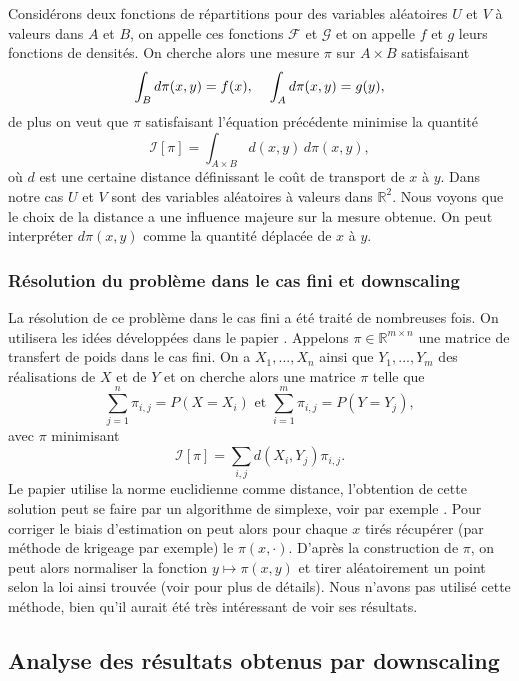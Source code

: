 \documentclass[a4paper,11pt]{article}
\numberwithin{equation}{section}
\begin{document}
Considérons deux fonctions de répartitions pour des variables aléatoires $U$ et $V$ à valeurs dans $A$ et $B$, on appelle ces fonctions $\mathcal{F}$ et $\mathcal{G}$ et on appelle $f$ et $g$ leurs fonctions de densités. On cherche alors une mesure $\pi$ sur  $A \times B$ satisfaisant
\[\int_{B} d\pi(x,y)= f(x), \hspace{4mm} \int_{A}  d \pi(x,y)= g(y),\]
de plus on veut que $\pi$ satisfaisant l'équation précédente minimise la quantité
\[\mathcal{I}[\pi]=\int_{A \times B}d(x,y) \, d\pi(x,y),\]
où $d$ est une certaine distance définissant le coût de transport de $x$ à $y$. Dans notre cas $U$ et $V$ sont des variables aléatoires à valeurs dans $\mathbb{R}^2$. Nous voyons que le choix de la distance a une influence majeure sur la mesure obtenue. On peut interpréter $d\pi(x,y)$ comme la quantité déplacée de $x$ à $y$.
\subsubsection{Résolution du problème dans le cas fini et downscaling}
La résolution de ce problème dans le cas fini a été traité de nombreuses fois. On utilisera les idées développées dans le papier \cite{robin2019multivariate}. Appelons $\pi \in \mathbb{R}^{m\times n}$ une matrice de transfert de poids dans le cas fini. On a $X_1,...,X_n$ ainsi que $Y_1,...,Y_m$ des réalisations de $X$ et de $Y$ et on cherche alors une matrice $\pi$ telle que 
\[\sum_{j=1}^{n} \pi_{i,j}= P(X=X_i) \textrm{ et } \sum_{i=1}^{m} \pi_{i,j}= P(Y=Y_j),\]
avec $\pi$ minimisant 
\[\mathcal{I}[\pi]=\sum_{i,j}d(X_i,Y_j)\pi_{i,j}.\]  
Le papier \cite{robin2019multivariate} utilise la norme euclidienne comme distance, l'obtention de cette solution peut se faire par un algorithme de simplexe, voir par exemple \cite{huang2012optimal}. Pour corriger le biais d'estimation on peut alors pour chaque $x$ tirés récupérer (par méthode de krigeage par exemple) le $\pi(x,\cdot)$. D'après la construction de $\pi$, on peut alors normaliser la fonction $y\mapsto \pi(x,y)$ et tirer aléatoirement un point selon la loi ainsi trouvée (voir \cite{robin2019multivariate} pour plus de détails). Nous n'avons pas utilisé cette méthode, bien qu'il aurait été très intéressant de voir ses résultats.


\subsection{Analyse des résultats obtenus par downscaling}
\label{analyse-pred}
\end{document}
